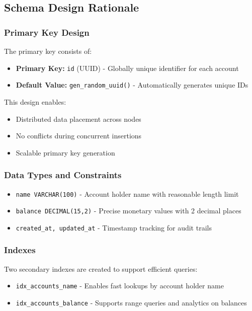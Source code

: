\subsection{Schema Design Rationale}

\subsubsection{Primary Key Design}
The primary key consists of:
\begin{itemize}
    \item \textbf{Primary Key:} \texttt{id} (UUID) - Globally unique identifier for each account
    \item \textbf{Default Value:} \texttt{gen\_random\_uuid()} - Automatically generates unique IDs
\end{itemize}

This design enables:
\begin{itemize}
    \item Distributed data placement across nodes
    \item No conflicts during concurrent insertions
    \item Scalable primary key generation
\end{itemize}

\subsubsection{Data Types and Constraints}
\begin{itemize}
    \item \texttt{name VARCHAR(100)} - Account holder name with reasonable length limit
    \item \texttt{balance DECIMAL(15,2)} - Precise monetary values with 2 decimal places
    \item \texttt{created\_at, updated\_at} - Timestamp tracking for audit trails
\end{itemize}

\subsubsection{Indexes}
Two secondary indexes are created to support efficient queries:
\begin{itemize}
    \item \texttt{idx\_accounts\_name} - Enables fast lookups by account holder name
    \item \texttt{idx\_accounts\_balance} - Supports range queries and analytics on balances
\end{itemize}

